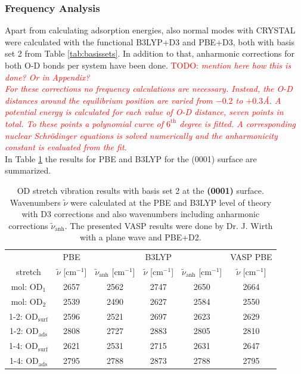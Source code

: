 \documentclass[11pt,DIV=13,BCOR=5mm,a4paper,headinclude]{scrbook}
\newcommand\todo[1]{\textcolor{red}{TODO: \textit{{#1}}}}
\begin{document}
\subsubsection{Frequency Analysis}
Apart from calculating adsorption energies, also normal modes with CRYSTAL were calculated with the functional B3LYP+D3 and PBE+D3, both with basis set 2 from Table \ref{tab:basissets}.
In addition to that, anharmonic corrections for both O-D bonds per system have been done.
\todo{mention here how this is done? Or in Appendix?\\
For these corrections no frequency calculations are necessary.
Instead, the O-D distances around the equilibrium position are varied from $-0.2$ to $+0.3$\AA{}.
A potential energy is calculated for each value of O-D distance, seven points in total.
 To these points a polynomial curve of $6^\textrm{th}$ degree is fitted.
A corresponding nuclear Schrödinger equations is solved numerically and the anharmonicity constant is evaluated from the fit.}
\\
In Table \ref{tab:freqs_0001_crystal} the results for PBE and B3LYP for the (0001) surface are summarized.
\begin{table}[!h]
  \centering
  \caption{OD stretch vibration results with basis set 2 at the \textbf{(0001)} surface.
Wavenumbers $\tilde{\nu}$ were calculated at the PBE and B3LYP level of theory with D3 corrections and also wavenumbers including anharmonic corrections $\tilde{\nu}_\textrm{anh}$.
The presented VASP results were done by Dr. J. Wirth with a plane wave and PBE+D2.}
  \begin{tabular}{ccc|cc|c}
  \toprule
   & PBE & & B3LYP & &VASP PBE\\
  stretch & $\tilde{\nu}$ [cm$^{-1}$] &$\tilde{\nu}_\textrm{anh}$ [cm$^{-1}$] &$\tilde{\nu}$ [cm$^{-1}$] & $\tilde{\nu}_\textrm{anh}$ [cm$^{-1}$]& $\tilde{\nu}$ [cm$^{-1}$]\\\midrule
  mol: OD$_{\textrm{1}}$    &2657 &2562 &2747 &2650 & 2664\\
  mol: OD$_{\textrm{2}}$    &2539 &2490 &2627 &2584 & 2550\\
  1-2: OD$_{\textrm{surf}}$ &2596 &2521 &2697 &2623 & 2629\\%
  1-2: OD$_{\textrm{ads}}$  &2808 &2727 &2883 &2805 & 2810\\%
  1-4: OD$_{\textrm{surf}}$ &2621 &2531 &2715 &2631 & 2647\\%
  1-4: OD$_{\textrm{ads}}$  &2795 &2788 &2873 &2788 & 2795\\%
  \bottomrule
    \end{tabular}
  \label{tab:freqs_0001_crystal}
\end{table}
\end{document}
